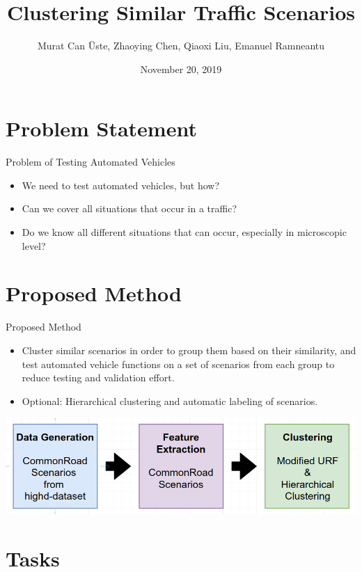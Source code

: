 \documentclass[shortpres]{beamer}
\title[Motion Planning for Autonomous Vehicles]{Clustering Similar Traffic Scenarios}
\author[]{Murat Can \"Uste, Zhaoying Chen, Qiaoxi Liu, Emanuel Ramneantu}
\institute[TU M\"unchen]{Technische Universit\"at M\"unchen}
\date{November 20, 2019}
\begin{document}
\begin{frame}
    \titlepage
\end{frame}


\section{Problem Statement}	

\begin{frame}{Problem of Testing Automated Vehicles}	

\begin{itemize} 
\item We need to test automated vehicles, but how?
\vfill \item  Can we cover all situations that occur in a traffic?
\vfill \item  Do we know all different situations that can occur, especially in microscopic level?
\end{itemize}
\end{frame}

\section{Proposed Method}	

\begin{frame}{Proposed Method}	

\begin{itemize} 
\item Cluster similar scenarios in order to group them based on their similarity, and test automated vehicle functions on a set of scenarios from each group to reduce testing and validation effort.
\vfill \item  Optional: Hierarchical clustering and automatic labeling of scenarios.
\end{itemize}

\includegraphics[width=\textwidth]{proposed_01}
\end{frame}

\section{Tasks}	
\end{document}
